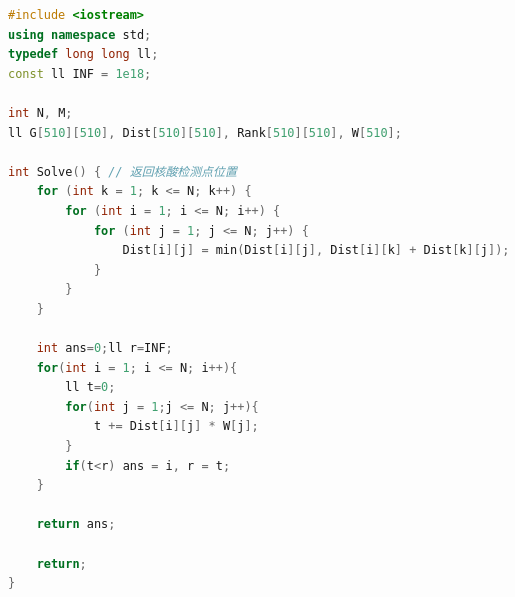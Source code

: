 \documentclass{cumcmthesis}
\begin{document}
\begin{appendices}
\begin{lstlisting}[language=cpp]
#include <iostream>
using namespace std;
typedef long long ll;
const ll INF = 1e18;

int N, M;
ll G[510][510], Dist[510][510], Rank[510][510], W[510];

int Solve() { // 返回核酸检测点位置
    for (int k = 1; k <= N; k++) {
        for (int i = 1; i <= N; i++) {
            for (int j = 1; j <= N; j++) {
                Dist[i][j] = min(Dist[i][j], Dist[i][k] + Dist[k][j]);
            }
        }
    }

    int ans=0;ll r=INF;
    for(int i = 1; i <= N; i++){
        ll t=0;
        for(int j = 1;j <= N; j++){
            t += Dist[i][j] * W[j];
        }
        if(t<r) ans = i, r = t;
    }

    return ans;
    
    return;
}
\end{lstlisting}

\end{appendices}
\end{document}
